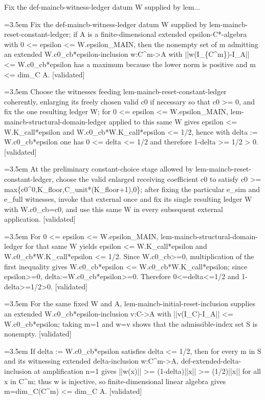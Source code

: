 \documentclass{article}
\newcommand{\step}[1]{\par\noindent\hangindent=3.5em\hangafter=1%
  \makebox[3.5em][l]{\textbf{#1.}}}
\newcommand{\steptag}[1]{\hfill{\small\textsf{[#1]}}}
\begin{document}
\begin{proofbox}{Fix the def-maincb-witness-ledger datum W supplied by lem...}
\step{1} Fix the def-maincb-witness-ledger datum W supplied by lem-maincb-reset-constant-ledger; if A is a finite-dimensional extended epsilon-C*-algebra with 0 <= epsilon <= W.epsilon\_MAIN, then the nonempty set of m admitting an extended W.c0\_cb*epsilon-inclusion w:C\textasciicircum{}m->A with ||w(I\_\{C\textasciicircum{}m\})-I\_A|| <= W.c0\_cb*epsilon has a maximum because the lower norm is positive and m <= dim\_C A. \steptag{validated} \\[6pt]
\step{1.1} Choose the witnesses feeding lem-maincb-reset-constant-ledger coherently, enlarging its freely chosen valid c0 if necessary so that c0 >= 0, and fix the one resulting ledger W; for 0 <= epsilon <= W.epsilon\_MAIN, lem-maincb-structural-domain-ledger applied to this same W gives epsilon <= W.K\_call*epsilon and W.c0\_cb*W.K\_call*epsilon <= 1/2, hence with delta := W.c0\_cb*epsilon one has 0 <= delta <= 1/2 and therefore 1-delta >= 1/2 > 0. \steptag{validated} \\[6pt]
\step{1.1.1} At the preliminary constant-choice stage allowed by lem-maincb-reset-constant-ledger, choose the valid enlarged receiving coefficient c0 to satisfy c0 >= max\{c0\textasciicircum{}0,K\_floor,C\_unit*(K\_floor+1),0\}; after fixing the particular e\_sim and e\_full witnesses, invoke that external once and fix its single resulting ledger W with W.c0\_cb=c0, and use this same W in every subsequent external application. \steptag{validated} \\[4pt]
\step{1.1.2} For 0 <= epsilon <= W.epsilon\_MAIN, lem-maincb-structural-domain-ledger for that same W yields epsilon <= W.K\_call*epsilon and W.c0\_cb*W.K\_call*epsilon <= 1/2. Since W.c0\_cb>=0, multiplication of the first inequality gives W.c0\_cb*epsilon <= W.c0\_cb*W.K\_call*epsilon; since epsilon>=0, delta:=W.c0\_cb*epsilon>=0. Therefore 0<=delta<=1/2 and 1-delta>=1/2>0. \steptag{validated} \\[4pt]
\step{1.2} For the same fixed W and A, lem-maincb-initial-reset-inclusion supplies an extended W.c0\_cb*epsilon-inclusion v:C->A with ||v(I\_C)-I\_A|| <= W.c0\_cb*epsilon; taking m=1 and w=v shows that the admissible-index set S is nonempty. \steptag{validated} \\[4pt]
\step{1.3} If delta := W.c0\_cb*epsilon satisfies delta <= 1/2, then for every m in S and its witnessing extended delta-inclusion w:C\textasciicircum{}m->A, def-extended-delta-inclusion at amplification n=1 gives ||w(x)|| >= (1-delta)||x|| >= (1/2)||x|| for all x in C\textasciicircum{}m; thus w is injective, so finite-dimensional linear algebra gives m=dim\_C(C\textasciicircum{}m) <= dim\_C A. \steptag{validated} \\[6pt]

\end{proofbox}
\end{document}
